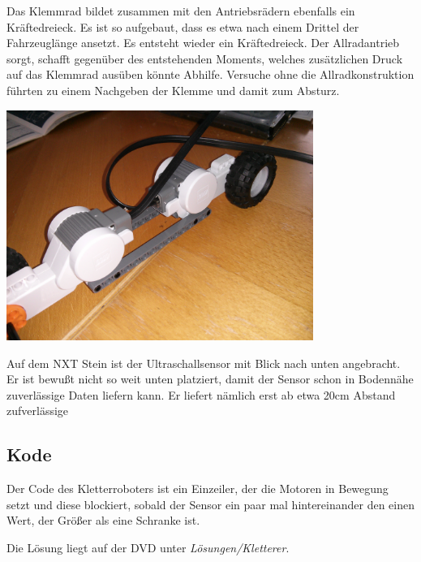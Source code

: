       Das Klemmrad bildet zusammen mit den Antriebsrädern ebenfalls ein Kräftedreieck. Es ist so aufgebaut, dass es etwa nach einem Drittel der Fahrzeuglänge ansetzt. Es entsteht wieder ein Kräftedreieck. Der Allradantrieb sorgt, schafft gegenüber des entstehenden Moments, welches zusätzlichen Druck auf das Klemmrad ausüben könnte Abhilfe. Versuche ohne die Allradkonstruktion führten zu einem Nachgeben der Klemme und damit zum Absturz.
      
      \begin{capfigure}
	\includegraphics[width=10cm]{images/kletter3.jpg}
      \end{capfigure}
    
      Auf dem NXT Stein ist der Ultraschallsensor mit Blick nach unten angebracht. Er ist bewußt nicht so weit unten platziert, damit der Sensor schon in Bodennähe zuverlässige
      Daten liefern kann. Er liefert nämlich erst ab etwa 20cm Abstand zufverlässige 
    
    \subsection{Kode}
      Der Code des Kletterroboters ist ein Einzeiler, der die Motoren in Bewegung setzt und diese blockiert, sobald der Sensor ein paar mal hintereinander den einen Wert, der Größer als eine Schranke ist. 
    
    
Die Lösung liegt auf der DVD unter \textit{Lösungen/Kletterer}. 
